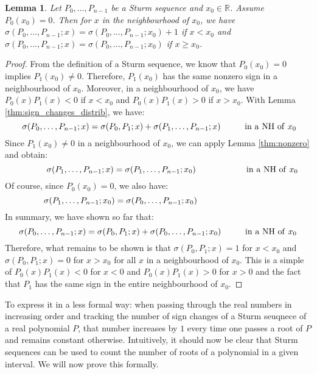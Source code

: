 \documentclass[11pt,a4paper,oneside]{article}
\newtheorem{lemma}[definition]{Lemma}
\newcommand{\RR}{\mathbb{R}}
\begin{document}
\newpage
\label{thm:zero}
\begin{lemma}
Let $P_0,\ldots,P_{n-1}$ be a Sturm sequence and $x_0\in\RR$. Assume $P_0(x_0)=0$. Then for $x$ in the neighbourhood of $x_0$, we have $\sigma(P_0,\ldots,P_{n-1};x)=\sigma(P_0,\ldots,P_{n-1};x_0)+1$ if $x<x_0$ and $\sigma(P_0,\ldots,P_{n-1};x)=\sigma(P_0,\ldots,P_{n-1};x_0)$ if $x\geq x_0$.
\end{lemma}
\begin{proof}
From the definition of a Sturm sequence, we know that $P_0(x_0)=0$ implies $P_1(x_0)\neq 0$. Therefore, $P_1(x_0)$ has the same nonzero sign in a neighbourhood of $x_0$. Moreover, in a neighbourhood of $x_0$, we have $P_0(x)P_1(x)<0$ if $x<x_0$ and $P_0(x)P_1(x)>0$ if $x>x_0$. With Lemma \ref{thm:sign_changes_distrib}, we have:
$$\hskip1mm\sigma(P_0,\ldots,P_{n-1};x)=\sigma(P_0,P_1;x)+\sigma(P_1,\ldots,P_{n-1};x) \hskip10mm\mathrm{in\ a\ NH\ of\ }x_0$$
Since $P_1(x_0)\neq 0$ in a neighbourhood of $x_0$, we can apply Lemma \ref{thm:nonzero} and obtain:
$$\hskip12mm\sigma(P_1,\ldots,P_{n-1};x) = \sigma(P_1,\ldots,P_{n-1};x_0) \hskip21mm\mathrm{in\ a\ NH\ of\ }x_0$$
Of course, since $P_0(x_0)=0$, we also have:
$$\sigma(P_1,\ldots,P_{n-1};x_0) = \sigma(P_0,\ldots,P_{n-1};x_0)\hskip31mm$$
In summary, we have shown so far that:
$$\sigma(P_0,\ldots,P_{n-1};x)=\sigma(P_0,P_1;x) + \sigma(P_0,\ldots,P_{n-1};x_0) \hskip10mm\mathrm{in\ a\ NH\ of\ }x_0$$
Therefore, what remains to be shown is that $\sigma(P_0,P_1;x)=1$ for $x<x_0$ and $\sigma(P_0,P_1;x)=0$ for $x>x_0$ for all $x$ in a neighbourhood of $x_0$. This is a simple of $P_0(x)P_1(x)<0$ for $x<0$ and $P_0(x)P_1(x)>0$ for $x>0$ and the fact that $P_1$ has the same sign in the entire neighbourhood of $x_0$.
\end{proof}\vskip5mm

To express it in a less formal way: when passing through the real numbers in increasing order and tracking the number of sign changes of a Sturm seuqnece of a real polynomial $P$, that number increases by $1$ every time one passes a root of $P$ and remains constant otherwise. Intuitively, it should now be clear that Sturm sequences can be used to count the number of roots of a polynomial in a given interval. We will now prove this formally.
\end{document}
